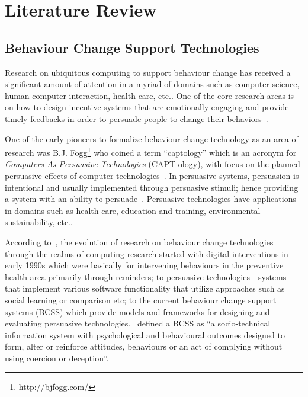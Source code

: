 
\chapter{Literature Review} %

\label{literaturereview} %


\section{Behaviour Change Support Technologies}
Research on ubiquitous computing to support behaviour change  has received a significant amount of attention in a myriad of domains such as computer science, human-computer interaction, health care, etc.. One of the core research areas is on how to design incentive systems that are emotionally engaging and  provide timely feedbacks in order to persuade people to change their behaviors~\citep{nakajima2013designing}. 

One of the early pioneers to formalize behaviour change technology as an area of research was B.J. Fogg\footnote{http://bjfogg.com/} who coined a term “captology” which is an acronym for \emph{Computers As Persuasive Technologies} (CAPT-ology), with focus on the planned persuasive effects of computer technologies~\citep{fogg1999persuasive}. In persuasive systems, persuasion is intentional and usually implemented through persuasive stimuli; hence providing a system with an ability to persuade~\citep{hamari2014persuasive}. Persuasive technologies have applications in domains such as health-care, education and training, environmental sustainability, etc..

According to~\cite{langrial2012digital}, the evolution of research on behaviour change technologies through the realms of computing research started with digital interventions in early 1990s which were basically for intervening behaviours in the preventive health area primarily through reminders; to persuasive technologies - systems that implement various software functionality that utilize approaches such as social learning or comparison etc; to the current behaviour change support systems (BCSS) which provide models and frameworks for designing and evaluating persuasive technologies.~\cite{Oinas-Kukkonen:foundation} defined a BCSS  as ``a socio-technical information system with psychological and behavioural outcomes designed to form, alter or reinforce attitudes, behaviours or an act of complying without using coercion or deception''.

